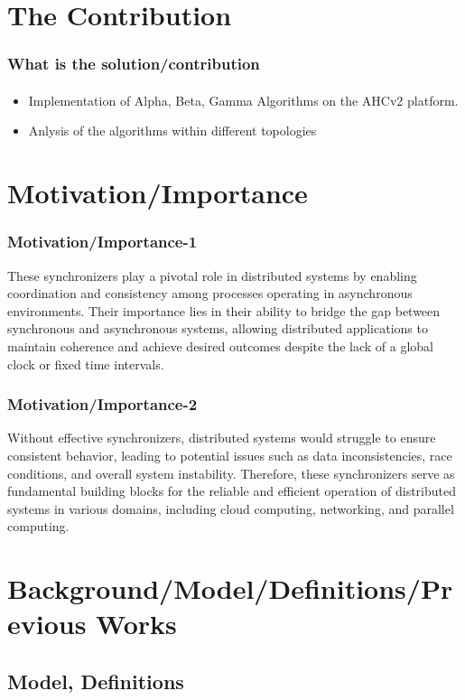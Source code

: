 \documentclass[11pt]{beamer}              %
\begin{document}
\section{The Contribution}
\begin{frame}
	\frametitle{What is the solution/contribution}
	\framesubtitle{}
	\begin{itemize}
		\item Implementation of Alpha, Beta, Gamma Algorithms on the AHCv2 platform.
		\item Anlysis of the algorithms within different topologies
	\end{itemize}
\end{frame}


\section{Motivation/Importance}
\begin{frame}
	\frametitle{Motivation/Importance-1}
	These synchronizers play a pivotal role in distributed systems by enabling coordination and consistency among processes operating in asynchronous environments. Their importance lies in their ability to bridge the gap between synchronous and asynchronous systems, allowing distributed applications to maintain coherence and achieve desired outcomes despite the lack of a global clock or fixed time intervals.
\end{frame}

\begin{frame}
	\frametitle{Motivation/Importance-2}
	Without effective synchronizers, distributed systems would struggle to ensure consistent behavior, leading to potential issues such as data inconsistencies, race conditions, and overall system instability. Therefore, these synchronizers serve as fundamental building blocks for the reliable and efficient operation of distributed systems in various domains, including cloud computing, networking, and parallel computing.
\end{frame}

\section{Background/Model/Definitions/Previous Works}


\subsection{Model, Definitions}
\end{document}
